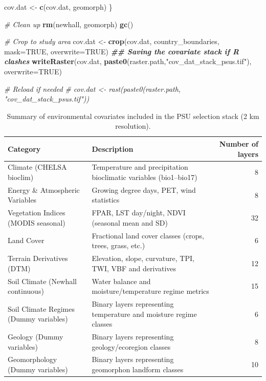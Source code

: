 \documentclass[
  10pt,
  b5paper,
  oneside]{book}
\newenvironment{Shaded}{\begin{snugshade}}{\end{snugshade}}
\newcommand{\AttributeTok}[1]{\textcolor[rgb]{0.13,0.29,0.53}{#1}}
\newcommand{\CommentTok}[1]{\textcolor[rgb]{0.56,0.35,0.01}{\textit{#1}}}
\newcommand{\ConstantTok}[1]{\textcolor[rgb]{0.56,0.35,0.01}{#1}}
\newcommand{\DocumentationTok}[1]{\textcolor[rgb]{0.56,0.35,0.01}{\textbf{\textit{#1}}}}
\newcommand{\FunctionTok}[1]{\textcolor[rgb]{0.13,0.29,0.53}{\textbf{#1}}}
\newcommand{\NormalTok}[1]{#1}
\newcommand{\OtherTok}[1]{\textcolor[rgb]{0.56,0.35,0.01}{#1}}
\newcommand{\StringTok}[1]{\textcolor[rgb]{0.31,0.60,0.02}{#1}}
\begin{document}
\begin{Shaded}
\begin{Highlighting}[]
\NormalTok{  cov.dat }\OtherTok{\textless{}{-}} \FunctionTok{c}\NormalTok{(cov.dat, geomorph)}
\NormalTok{\}}

\CommentTok{\# Clean up}
\FunctionTok{rm}\NormalTok{(newhall, geomorph)}
\FunctionTok{gc}\NormalTok{()}

\CommentTok{\# Crop to study area}
\NormalTok{cov.dat }\OtherTok{\textless{}{-}} \FunctionTok{crop}\NormalTok{(cov.dat, country\_boundaries, }\AttributeTok{mask=}\ConstantTok{TRUE}\NormalTok{, }\AttributeTok{overwrite=}\ConstantTok{TRUE}\NormalTok{)}
\DocumentationTok{\#\# Saving the covariate stack if R clashes}
\FunctionTok{writeRaster}\NormalTok{(cov.dat, }\FunctionTok{paste0}\NormalTok{(raster.path,}\StringTok{"cov\_dat\_stack\_psus.tif"}\NormalTok{), }\AttributeTok{overwrite=}\ConstantTok{TRUE}\NormalTok{)}

\CommentTok{\# Reload if needed}
\CommentTok{\# cov.dat \textless{}{-} rast(paste0(raster.path, "cov\_dat\_stack\_psus.tif"))}
\end{Highlighting}
\end{Shaded}

\begin{table}

\caption{\label{tab:table-final-covs}Summary of environmental covariates included in the PSU selection stack (2 km resolution).}
\centering
\begin{tabular}[t]{l|l|r}
\hline
Category & Description & Number of layers\\
\hline
Climate (CHELSA bioclim) & Temperature and precipitation bioclimatic variables (bio1–bio17) & 8\\
\hline
Energy \& Atmospheric Variables & Growing degree days, PET, wind statistics & 8\\
\hline
Vegetation Indices (MODIS seasonal) & FPAR, LST day/night, NDVI (seasonal mean and SD) & 32\\
\hline
Land Cover & Fractional land cover classes (crops, trees, grass, etc.) & 6\\
\hline
Terrain Derivatives (DTM) & Elevation, slope, curvature, TPI, TWI, VBF and derivatives & 12\\
\hline
Soil Climate (Newhall continuous) & Water balance and moisture/temperature regime metrics & 15\\
\hline
Soil Climate Regimes (Dummy variables) & Binary layers representing temperature and moisture regime classes & 6\\
\hline
Geology (Dummy variables) & Binary layers representing geology/ecoregion classes & 8\\
\hline
Geomorphology (Dummy variables) & Binary layers representing geomorphon landform classes & 10\\
\hline
\end{tabular}
\end{table}
\end{document}
